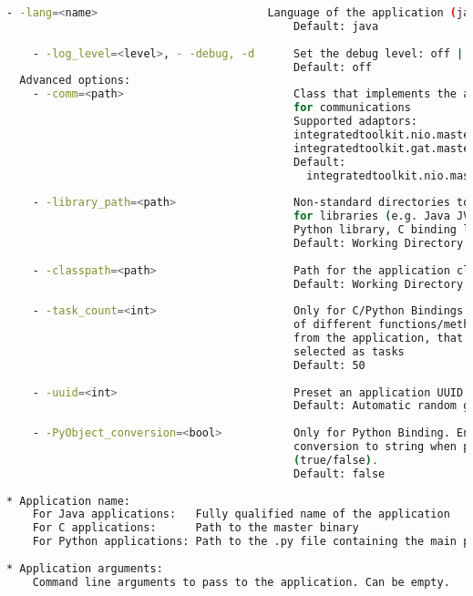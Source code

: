 \begin{lstlisting}[language=bash]
    - -lang=<name>                          Language of the application (java/c/python)
                                            Default: java
                                            
    - -log_level=<level>, - -debug, -d      Set the debug level: off | info | debug
                                            Default: off
  Advanced options:
    - -comm=<path>                          Class that implements the adaptor 
                                            for communications
                                            Supported adaptors: 
                                            integratedtoolkit.nio.master.NIOAdaptor | 
                                            integratedtoolkit.gat.master.GATAdaptor
                                            Default: 
                                              integratedtoolkit.nio.master.NIOAdaptor
                                              
    - -library_path=<path>                  Non-standard directories to search 
                                            for libraries (e.g. Java JVM library, 
                                            Python library, C binding library) 
                                            Default: Working Directory
                                            
    - -classpath=<path>                     Path for the application classes / modules
                                            Default: Working Directory
                                            
    - -task_count=<int>                     Only for C/Python Bindings. Maximum number
                                            of different functions/methods, invoked
                                            from the application, that have been
                                            selected as tasks
                                            Default: 50
                                            
    - -uuid=<int>                           Preset an application UUID
                                            Default: Automatic random generation
                                            
    - -PyObject_conversion=<bool>           Only for Python Binding. Enable the object
                                            conversion to string when possible
                                            (true/false).
                                            Default: false
                                            
* Application name:
    For Java applications:   Fully qualified name of the application
    For C applications:      Path to the master binary
    For Python applications: Path to the .py file containing the main program
    
* Application arguments:
    Command line arguments to pass to the application. Can be empty. 
                                            
\end{lstlisting}

